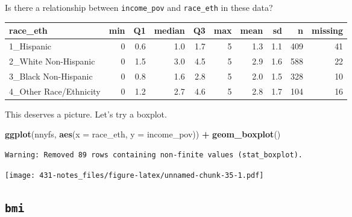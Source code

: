 \documentclass[
]{book}
\newenvironment{Shaded}{\begin{snugshade}}{\end{snugshade}}
\newcommand{\DataTypeTok}[1]{\textcolor[rgb]{0.13,0.29,0.53}{#1}}
\newcommand{\DecValTok}[1]{\textcolor[rgb]{0.00,0.00,0.81}{#1}}
\newcommand{\KeywordTok}[1]{\textcolor[rgb]{0.13,0.29,0.53}{\textbf{#1}}}
\newcommand{\NormalTok}[1]{#1}
\newcommand{\OperatorTok}[1]{\textcolor[rgb]{0.81,0.36,0.00}{\textbf{#1}}}
\newcommand{\StringTok}[1]{\textcolor[rgb]{0.31,0.60,0.02}{#1}}
\begin{document}
Is there a relationship between \texttt{income\_pov} and \texttt{race\_eth} in these data?

\begin{Shaded}
\end{Shaded}

\begin{tabular}{l|r|r|r|r|r|r|r|r|r}
\hline
race\_eth & min & Q1 & median & Q3 & max & mean & sd & n & missing\\
\hline
1\_Hispanic & 0 & 0.6 & 1.0 & 1.7 & 5 & 1.3 & 1.1 & 409 & 41\\
\hline
2\_White Non-Hispanic & 0 & 1.5 & 3.0 & 4.5 & 5 & 2.9 & 1.6 & 588 & 22\\
\hline
3\_Black Non-Hispanic & 0 & 0.8 & 1.6 & 2.8 & 5 & 2.0 & 1.5 & 328 & 10\\
\hline
4\_Other Race/Ethnicity & 0 & 1.2 & 2.7 & 4.6 & 5 & 2.8 & 1.7 & 104 & 16\\
\hline
\end{tabular}

This deserves a picture. Let's try a boxplot.

\begin{Shaded}
\begin{Highlighting}[]
\KeywordTok{ggplot}\NormalTok{(nnyfs, }\KeywordTok{aes}\NormalTok{(}\DataTypeTok{x =}\NormalTok{ race_eth, }\DataTypeTok{y =}\NormalTok{ income_pov)) }\OperatorTok{+}
\StringTok{  }\KeywordTok{geom_boxplot}\NormalTok{()}
\end{Highlighting}
\end{Shaded}

\begin{verbatim}
Warning: Removed 89 rows containing non-finite values (stat_boxplot).
\end{verbatim}

\texttt{[image: 431-notes\_files/figure-latex/unnamed-chunk-35-1.pdf]}

\hypertarget{bmi}{%
\subsection{\texorpdfstring{\texttt{bmi}}{bmi}}\label{bmi}}
\end{document}
